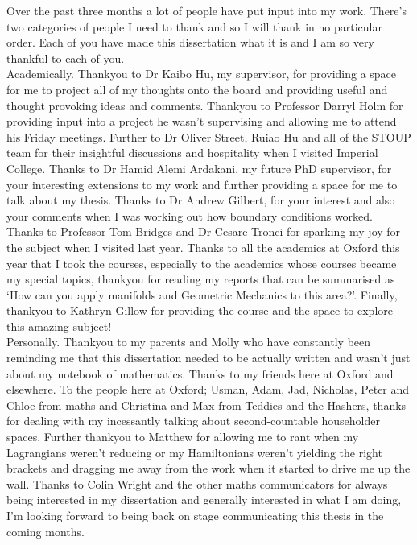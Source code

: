 
Over the past three months a lot of people have put input into my work. There's two categories of people I need to thank and so I will thank in no particular order. Each of you have made this dissertation what it is and I am so very thankful to each of you. \\

\noindent
Academically. Thankyou to Dr Kaibo Hu, my supervisor, for providing a space for me to project all of my thoughts onto the board and providing useful and thought provoking ideas and comments. Thankyou to Professor Darryl Holm for providing input into a project he wasn't supervising and allowing me to attend his Friday meetings. Further to Dr Oliver Street, Ruiao Hu and all of the STOUP team for their insightful discussions and hospitality when I visited Imperial College. Thanks to Dr Hamid Alemi Ardakani, my future PhD supervisor, for your interesting extensions to my work and further providing a space for me to talk about my thesis. Thanks to Dr Andrew Gilbert, for your interest and also your comments when I was working out how boundary conditions worked. Thanks to Professor Tom Bridges and Dr Cesare Tronci for sparking my joy for the subject when I visited last year. Thanks to all the academics at Oxford this year that I took the courses, especially to the academics whose courses became my special topics, thankyou for reading my reports that can be summarised as `How can you apply manifolds and Geometric Mechanics to this area?'. Finally, thankyou to Kathryn Gillow for providing the course and the space to explore this amazing subject!\\

\noindent
Personally. Thankyou to my parents and Molly who have constantly been reminding me that this dissertation needed to be actually written and wasn't just about my notebook of mathematics. Thanks to my friends here at Oxford and elsewhere. To the people here at Oxford; Usman, Adam, Jad, Nicholas, Peter and Chloe from maths and Christina and Max from Teddies and the Hashers, thanks for dealing with my incessantly talking about second-countable householder spaces. Further thankyou to Matthew for allowing me to rant when my Lagrangians weren't reducing or my Hamiltonians weren't yielding the right brackets and dragging me away from the work when it started to drive me up the wall. Thanks to Colin Wright and the other maths communicators for always being interested in my dissertation and generally interested in what I am doing, I'm looking forward to being back on stage communicating this thesis in the coming months.